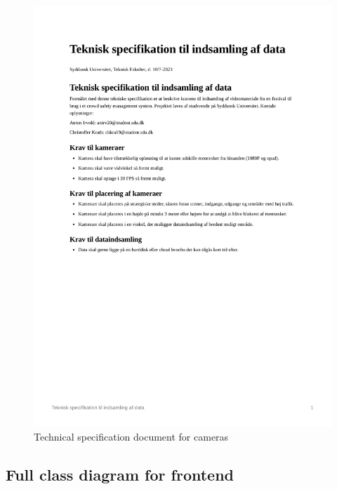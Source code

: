 \documentclass[
]{article}
\begin{document}
\begin{figure}

{\centering \includegraphics{../appendices/teknisk-specifikation.png}

}

\caption{\label{fig-camera-specs}Technical specification document for
cameras}

\end{figure}

\newpage{}

\hypertarget{full-class-diagram-for-frontend}{%
\subsection*{Full class diagram for
frontend}\label{full-class-diagram-for-frontend}}
\end{document}
